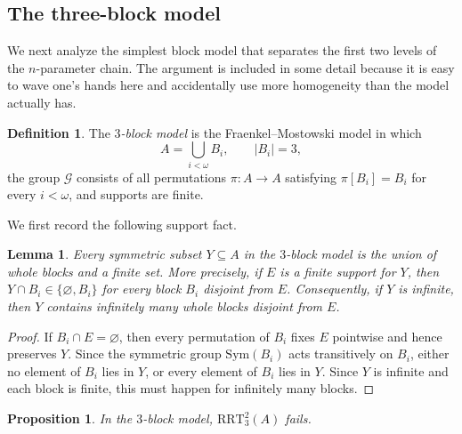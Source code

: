 \documentclass[11pt]{amsart}
\newtheorem{proposition}[theorem]{Proposition}
\newtheorem{lemma}[theorem]{Lemma}
\theoremstyle{definition}
\newtheorem{definition}[theorem]{Definition}
\newcommand{\RRT}{\mathrm{RRT}}
\begin{document}
\subsection{The three-block model}

We next analyze the simplest block model that separates the first two levels of the \(n\)-parameter chain.  The argument is included in some detail because it is easy to wave one's hands here and accidentally use more homogeneity than the model actually has.

\begin{definition}\label{def:block-model}
The \emph{\(3\)-block model} is the Fraenkel--Mostowski model in which
\[
    A=\bigcup_{i<\omega}B_i,
    \qquad |B_i|=3,
\]
the group \(\mathcal G\) consists of all permutations \(\pi:A\to A\) satisfying \(\pi[B_i]=B_i\) for every \(i<\omega\), and supports are finite.
\end{definition}

We first record the following support fact.

\begin{lemma}\label{lem:block-support}
Every symmetric subset \(Y\subseteq A\) in the \(3\)-block model is the union of whole blocks and a finite set.  More precisely, if \(E\) is a finite support for \(Y\), then \(Y\cap B_i\in\{\varnothing,B_i\}\) for every block \(B_i\) disjoint from \(E\).  Consequently, if \(Y\) is infinite, then \(Y\) contains infinitely many whole blocks disjoint from \(E\).
\end{lemma}

\begin{proof}
If \(B_i\cap E=\varnothing\), then every permutation of \(B_i\) fixes \(E\) pointwise and hence preserves \(Y\).  Since the symmetric group \(\mathrm{Sym}(B_i)\) acts transitively on \(B_i\), either no element of \(B_i\) lies in \(Y\), or every element of \(B_i\) lies in \(Y\).  Since \(Y\) is infinite and each block is finite, this must happen for infinitely many blocks.
\end{proof}

\begin{proposition}\label{prop:block-rrt23-fails}
In the \(3\)-block model, \(\RRT^2_3(A)\) fails.
\end{proposition}
\end{document}
